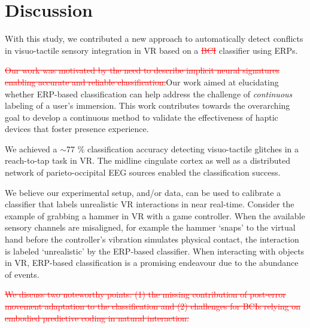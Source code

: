 \section{Discussion}

With this study, we contributed a new approach to automatically detect conflicts in visuo-tactile sensory integration in VR based on a \textcolor{red}{\st{BCI}} classifier using ERPs. 

\textcolor{red}{\st{Our work was motivated by the need to describe implicit neural signatures enabling accurate and reliable classification.}}\textcolor{n}{Our work aimed at elucidating whether ERP-based classification can help address the challenge of \textit{continuous} labeling of a user's immersion. This work contributes towards the overarching goal to develop a continuous method to validate the effectiveness of haptic devices that foster presence experience.} 

We achieved a $\sim$77 \% classification accuracy detecting visuo-tactile glitches in a reach-to-tap task in VR. The midline cingulate cortex as well as a distributed network of parieto-occipital EEG sources enabled the classification success.

\textcolor{n}{We believe our experimental setup, and/or data, can be used to calibrate a classifier that labels unrealistic VR interactions in near real-time. Consider the example of grabbing a hammer in VR with a game controller. When the available sensory channels are misaligned, for example the hammer `snaps' to the virtual hand before the controller's vibration simulates physical contact, the interaction is labeled `unrealistic' by the ERP-based classifier. When interacting with objects in VR, ERP-based classification is a promising endeavour due to the abundance of events.}

\textcolor{red}{\st{We discuss two noteworthy points: (1) the missing contribution of post-error movement adaptation to the classification and (2) challenges for BCIs relying on embodied predictive coding in natural interaction.}}

